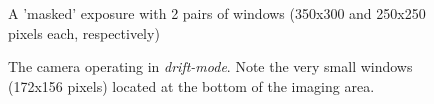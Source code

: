 \begin{figure}  
  \centering
  \setlength{\fboxsep}{0pt}
  \setlength{\fboxrule}{1pt}
  \caption{A 'masked' exposure with 2 pairs of windows (350x300 and 250x250 pixels each, respectively)}
  \label{fig:V713Cep}
\end{figure}

\begin{figure}  
  \centering
  \setlength{\fboxsep}{0pt}
  \setlength{\fboxrule}{1pt}
  \caption{The camera operating in \emph{drift-mode}. Note the very small windows (172x156 pixels) located at the bottom of the imaging area.}
  \label{fig:V834Cen}
\end{figure}


